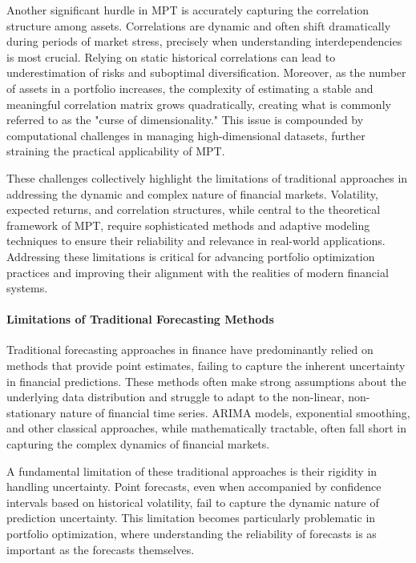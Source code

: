 Another significant hurdle in MPT is accurately capturing the correlation structure among assets. Correlations are dynamic and often shift dramatically during periods of market stress, precisely when understanding interdependencies is most crucial. Relying on static historical correlations can lead to underestimation of risks and suboptimal diversification. Moreover, as the number of assets in a portfolio increases, the complexity of estimating a stable and meaningful correlation matrix grows quadratically, creating what is commonly referred to as the "curse of dimensionality." This issue is compounded by computational challenges in managing high-dimensional datasets, further straining the practical applicability of MPT.

These challenges collectively highlight the limitations of traditional approaches in addressing the dynamic and complex nature of financial markets. Volatility, expected returns, and correlation structures, while central to the theoretical framework of MPT, require sophisticated methods and adaptive modeling techniques to ensure their reliability and relevance in real-world applications. Addressing these limitations is critical for advancing portfolio optimization practices and improving their alignment with the realities of modern financial systems.

\paragraph{Limitations of Traditional Forecasting Methods}
Traditional forecasting approaches in finance have predominantly relied on methods that provide point estimates, failing to capture the inherent uncertainty in financial predictions. These methods often make strong assumptions about the underlying data distribution and struggle to adapt to the non-linear, non-stationary nature of financial time series. \ac{ARIMA} models, exponential smoothing, and other classical approaches, while mathematically tractable, often fall short in capturing the complex dynamics of financial markets.

A fundamental limitation of these traditional approaches is their rigidity in handling uncertainty. Point forecasts, even when accompanied by confidence intervals based on historical volatility, fail to capture the dynamic nature of prediction uncertainty. This limitation becomes particularly problematic in portfolio optimization, where understanding the reliability of forecasts is as important as the forecasts themselves.

